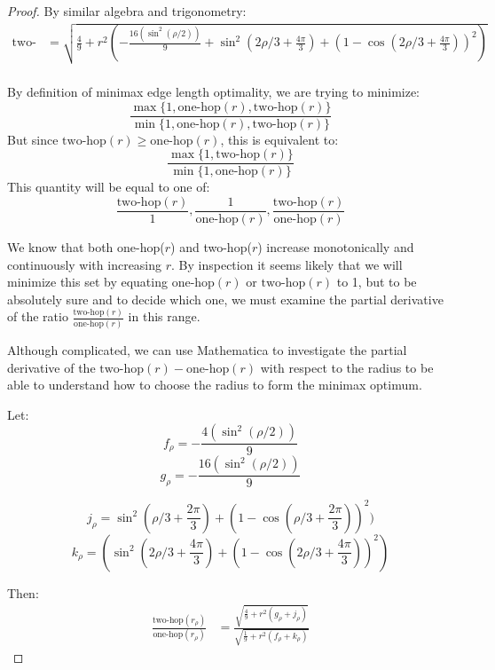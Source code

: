 \documentclass[review]{siamonline1116}
\begin{document}
\begin{proof}
By similar algebra and trigonometry:
\begin{align*}
  \text{two-hop}  &= \sqrt{\frac{4}{9} + r^2 (-\frac{16 (\sin^2( \rho / 2))}{9} + \sin^2(2\rho/3 + \frac{4\pi}{3})  + (1 - \cos(2\rho/3 + \frac{4\pi}{3}))^2)} \\
\end{align*}


By definition of minimax edge length optimality, we are trying to minimize:
\[
\frac{\max{\{1,\text{one-hop}(r),\text{two-hop}(r)}\}}{\min{\{1,\text{one-hop}(r),\text{two-hop}(r)}\}}
\]
But since $\text{two-hop}(r) \geq \text{one-hop}(r)$, this is equivalent to:
\[
 \frac{   \max \{1,\text{two-hop}(r)\}}
      {   \min \{1,\text{one-hop}(r)\}}
\]
This quantity will be equal to one of:
\begin{equation}
  \frac{\text{two-hop}(r)}{1},
\frac{1}{\text{one-hop}(r)},
\frac{\text{two-hop}(r)}{\text{one-hop}(r)}
\label{eq:ratioset}
\end{equation}

We know that both one-hop($r$) and two-hop($r$) increase monotonically and continuously with increasing $r$.
By inspection it seems likely that we will minimize this set by equating $\text{one-hop}(r)$ or $\text{two-hop}(r)$
to 1, but to be absolutely sure and to decide which one, we must examine the partial derivative of the ratio
 $\frac{\text{two-hop}(r)}{\text{one-hop}(r)}$ in this range.

Although complicated, we can use Mathematica to investigate
the partial derivative of the $\text{two-hop}(r) - \text{one-hop}(r)$ with respect
to the radius to be able to understand how to choose the radius to form the minimax optimum.

Let:
\begin{equation*}
  f_{\rho} = -\frac{4 (\sin^2( \rho / 2))}{9}
  \end{equation*}
\begin{equation*}
  g_{\rho} = -\frac{16 (\sin^2( \rho / 2))}{9} 
\end{equation*}

\begin{equation*}
  j_{\rho} = \sin^2(\rho/3+ \frac{2\pi}{3})  + (1 - \cos(\rho/3 + \frac{2\pi}{3}))^2)
\end{equation*}
\begin{equation*}
  k_{\rho} = (\sin^2(2\rho/3 + \frac{4\pi}{3})  + (1 - \cos(2\rho/3 + \frac{4\pi}{3}))^2)
\end{equation*}

Then:
\begin{align*}
  \frac{\text{two-hop}(r_{\rho})}{ \text{one-hop}(r_{\rho})}  &=
  \frac{\sqrt{\frac{4}{9}  + r^2(g_{\rho}+ j_{\rho})}}
       {\sqrt{\frac{1}{9} +r^2(f_{\rho}+k_{\rho}) }}
\end{align*}




\end{proof}
\end{document}
